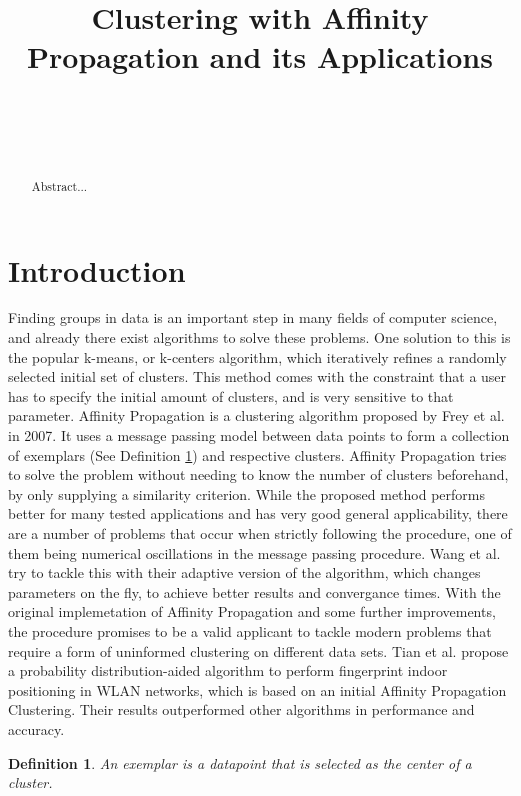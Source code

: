 \documentclass[11pt,a4paper]{article}
\title{Clustering with Affinity Propagation and its Applications}
\author{
 \authorname{Philipp-Alexander Auer} \\
 \studentnumber{01420446} \\
 \curriculum{033 535} \\
 \email{e1420446@student.tuwien.ac.at}
}
\newtheorem{definition}{Definition}
\begin{document}
\maketitle

\begin{abstract}
Abstract...
\end{abstract}

\section{Introduction}

Finding groups in data is an important step in many fields of computer science, and already there exist algorithms to solve these problems. One solution to this is the popular k-means, or k-centers algorithm, which iteratively refines a randomly selected initial set of clusters. This method comes with the constraint that a user has to specify the initial amount of clusters, and is very sensitive to that parameter. \cite{frey2007clustering} 
Affinity Propagation is a clustering algorithm proposed by Frey et al. in 2007. It uses a message passing model between data points to form a collection of exemplars (See Definition \ref{def:exemplar}) and respective clusters. \cite{frey2007clustering} Affinity Propagation tries to solve the problem without needing to know the number of clusters beforehand, by only supplying a similarity criterion.
While the proposed method performs better for many tested applications \cite{frey2007clustering} and has very good general applicability, there are a number of problems that occur when strictly following the procedure, one of them being numerical oscillations in the message passing procedure. Wang et al. try to tackle this with their adaptive version of the algorithm, which changes parameters on the fly, to achieve better results and convergance times. \cite{wang2008adaptive} With the original implemetation of Affinity Propagation and some further improvements, the procedure promises to be a valid applicant to tackle modern problems that require a form of uninformed clustering on different data sets. Tian et al. propose a probability distribution-aided algorithm to perform fingerprint indoor positioning in WLAN networks, which is based on an initial Affinity Propagation Clustering. Their results outperformed other algorithms in performance and accuracy. \cite{tian2013fingerprint}

\begin{definition}\label{def:exemplar}
	An exemplar is a datapoint that is selected as the center of a cluster.
\end{definition}
\end{document}
